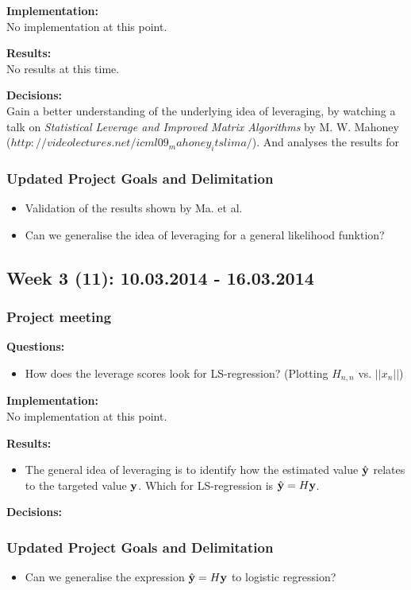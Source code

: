 \textbf{Implementation:}\\
No implementation at this point.

\textbf{Results:}\\
No results at this time.

\textbf{Decisions:}\\
Gain a better understanding of the underlying idea of leveraging, by watching a talk on \emph{Statistical Leverage and Improved Matrix Algorithms} by M. W. Mahoney ($http://videolectures.net/icml09_mahoney_itslima/$). And analyses the results for 

\subsubsection*{Updated Project Goals and Delimitation}
\begin{itemize}
\item Validation of the results shown by Ma. et al.
\item Can we generalise the idea of leveraging for a general likelihood funktion?
\end{itemize}

\subsection*{Week 3 (11): 10.03.2014 - 16.03.2014}
\subsubsection*{Project meeting}
\textbf{Questions:}\\
\begin{itemize}
\item How does the leverage scores look for LS-regression? (Plotting $H_{n,n}$ vs. $||x_n||$)
\end{itemize}
\textbf{Implementation:}\\
No implementation at this point.

\textbf{Results:}\\
\begin{itemize}
\item The general idea of leveraging is to identify how the estimated value $\hat{{\bf y}}$ relates to the targeted value ${\bf y}$. Which for LS-regression is $\hat{{\bf y}} = H {\bf y}$.
\end{itemize}

\textbf{Decisions:}\\

\subsubsection*{Updated Project Goals and Delimitation}
\begin{itemize}
\item Can we generalise the expression $\hat{{\bf y}} = H {\bf y}$ to logistic regression?
\end{itemize}

